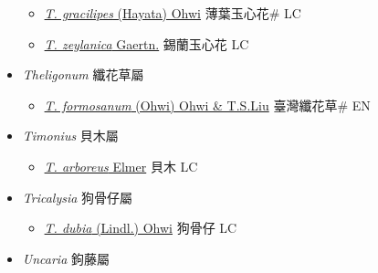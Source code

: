 \begin{itemize}
  \begin{itemize}
        \item[] \href{http://www.theplantlist.org/tpl1.1/search?q=Tarenna+gracilipes}{\textit{T. gracilipes} (Hayata) Ohwi}   薄葉玉心花\# LC
        \item[] \href{http://www.theplantlist.org/tpl1.1/search?q=Tarenna+zeylanica}{\textit{T. zeylanica} Gaertn.}   錫蘭玉心花 LC
  \end{itemize}
 \item[] \textit{Theligonum} 纖花草屬
                    
  \begin{itemize}
        \item[] \href{http://www.theplantlist.org/tpl1.1/search?q=Theligonum+formosanum}{\textit{T. formosanum} (Ohwi) Ohwi \& T.S.Liu}   臺灣纖花草\# EN
  \end{itemize}
 \item[] \textit{Timonius} 貝木屬
                    
  \begin{itemize}
        \item[] \href{http://www.theplantlist.org/tpl1.1/search?q=Timonius+arboreus}{\textit{T. arboreus} Elmer}   貝木 LC
  \end{itemize}
 \item[] \textit{Tricalysia} 狗骨仔屬
                    
  \begin{itemize}
        \item[] \href{http://www.theplantlist.org/tpl1.1/search?q=Tricalysia+dubia}{\textit{T. dubia} (Lindl.) Ohwi}   狗骨仔 LC
  \end{itemize}
 \item[] \textit{Uncaria} 鉤藤屬
                    

\end{itemize}
